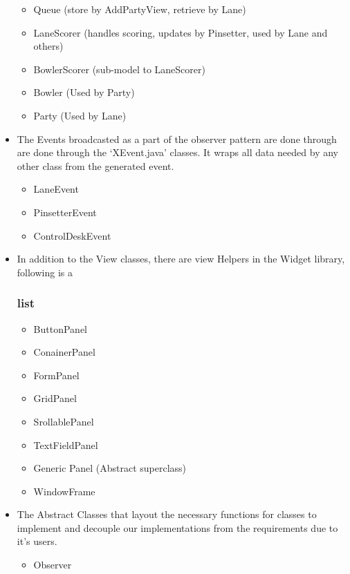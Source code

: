 \begin{itemize}
          \begin{itemize}
              \item Queue (store by AddPartyView, retrieve by Lane)
              \item LaneScorer (handles scoring, updates by Pinsetter, used by Lane and others)
              \item BowlerScorer (sub-model to LaneScorer)
              \item Bowler (Used by Party)
              \item Party (Used by Lane)
          \end{itemize}
    \item The Events broadcasted as a part of the observer pattern are done through are done through the `XEvent.java' classes. It wraps all data needed by any other class from the generated event.
          \begin{itemize}
              \item LaneEvent
              \item PinsetterEvent
              \item ControlDeskEvent
          \end{itemize}
    \item In addition to the View classes, there are view Helpers in the Widget library, following is a \subsubsection{list}
          \begin{itemize}
              \item ButtonPanel
              \item ConainerPanel
              \item FormPanel
              \item GridPanel
              \item SrollablePanel
              \item TextFieldPanel
              \item Generic Panel (Abstract superclass)
              \item WindowFrame
          \end{itemize}
    \item The Abstract Classes that layout the necessary functions for classes to implement and decouple our implementations from the requirements due to it's users.
          \begin{itemize}
              \item Observer

\end{itemize}
\end{itemize}

